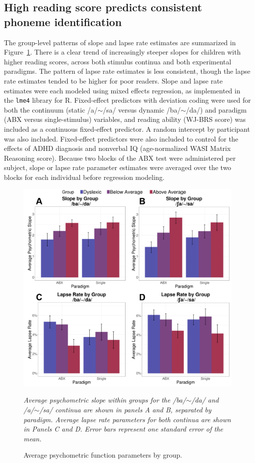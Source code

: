 \documentclass[../uwthesis.tex]{subfiles}
\begin{document}
\subsection{High reading score predicts consistent phoneme identification}
The group-level patterns of slope and lapse rate estimates are summarized in Figure~\ref{fig:d}. There is a clear trend of increasingly steeper slopes for children with higher reading scores, across both stimulus continua and both experimental paradigms. The pattern of lapse rate estimates is less consistent, though the lapse rate estimates tended to be higher for poor readers. Slope and lapse rate estimates were each modeled using mixed effects regression, as implemented in the \texttt{lme4} library for R. Fixed-effect predictors with deviation coding were used for both the continuum (static /a/$\sim$/sa/ versus dynamic /ba/$\sim$/da/) and paradigm (ABX versus single-stimulus) variables, and reading ability (WJ-BRS score) was included as a continuous fixed-effect predictor. A random intercept by participant was also included. Fixed-effect predictors were also included to control for the effects of ADHD diagnosis and nonverbal IQ (age-normalized WASI Matrix Reasoning score). Because two blocks of the ABX test were administered per subject, slope or lapse rate parameter estimates were averaged over the two blocks for each individual before regression modeling. 

\begin{figure}
    \centering
    \caption{Average psychometric function parameters by group.}
    \label{fig:d}
    \includegraphics[width = 14 cm]{images/paper_1/figure_slope_lapse_by_group_labels.png}
    \item \textit{Average psychometric slope within groups for the /ba/$\sim$/da/ and /a/$\sim$/sa/ continua are shown in panels A and B, separated by paradigm. Average lapse rate parameters for both continua are shown in Panels C and D. Error bars represent one standard error of the mean.}
\end{figure}
\end{document}
